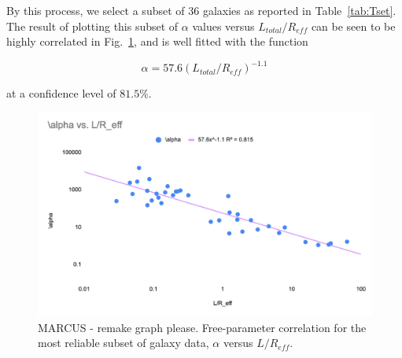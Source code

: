 \documentclass[reprint,%
 amsmath,amssymb,
 aps,
]{revtex4-1}
\begin{document}
   
  By this process, we select a subset of 36 galaxies as reported in Table~\ref{tab:Tset}. 
  The result of plotting this subset of $\alpha$ values versus $L_{total}/R_{eff}$ can be seen to be highly correlated in   Fig.~\ref{alpha2}, and is 
 well fitted with the function 
   
  
\begin{equation}
    \alpha = 57.6 (L_{total}/R_{eff})^{-1.1}
\end{equation}

at a confidence level of $81.5\%$.
  
 \begin{figure}[h]
\includegraphics[width=\linewidth]{figures/alphavL_Reff2.png} 
\caption{ MARCUS - remake graph please.  Free-parameter correlation for the most reliable subset of galaxy data, $\alpha$ versus    $L/R_{eff}$.   }
\label{alpha2}
\end{figure}  
 

 
 
\end{document}
